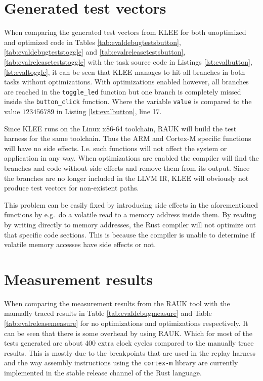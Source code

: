 
\section{Generated test vectors}
When comparing the generated test vectors from KLEE for both unoptimized and
optimized code in Tables \ref{tab:evaldebugtestsbutton},
\ref{tab:evaldebugteststoggle} and \ref{tab:evalreleasetestsbutton},
\ref{tab:evalreleaseteststoggle} with the task source code in Listings
\ref{lst:evalbutton}, \ref{lst:evaltoggle}, it can be seen that KLEE manages to
hit all branches in both tasks without optimizations. With optimizations
enabled however, all branches are reached in the \texttt{toggle\_led} function
but one branch is completely missed inside the \texttt{button\_click} function.
Where the variable \texttt{value} is compared to the value $123456789$ in
Listing \ref{lst:evalbutton}, line 17.

Since KLEE runs on the Linux x86-64 toolchain, RAUK will build the test harness
for the same toolchain. Thus the ARM and Cortex-M specific functions will have
no side effects. I.e. such functions will not affect the system or application
in any way. When optimizations are enabled the compiler will find the branches
and code without side effects and remove them from its output. Since the
branches are no longer included in the LLVM IR, KLEE will obviously not
produce test vectors for non-existent paths.

This problem can be easily fixed by introducing side effects in the
aforementioned functions by e.g.\ do a volatile read to a memory address
inside them. By reading by writing directly to memory addresses, the Rust
compiler will not optimize out that specific code sections. This is because
the compiler is unable to determine if volatile memory accesses have side
effects or not.

\section{Measurement results}
When comparing the measurement results from the RAUK tool with the manually
traced results in Table \ref{tab:evaldebugmeasure} and Table
\ref{tab:evalreleasemeasure} for no optimizations and optimizations
respectively. It can be seen that there is some overhead by using RAUK. Which
for most of the tests generated are about 400 extra clock cycles compared to
the manually trace results. This is mostly due to the breakpoints that are used
in the replay harness and the way assembly instructions using the
\texttt{cortex-m} library are currently implemented in the stable release
channel of the Rust language.

